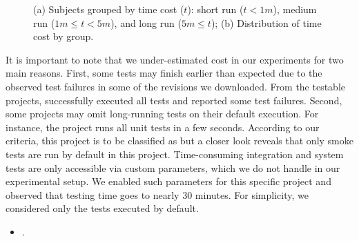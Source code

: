 \begin{figure}[ht]
\begin{subfigure}{0.25\textwidth}
        \caption{\label{fig:rq1-boxplot}}
    \end{subfigure}%
    \caption{(a) Subjects grouped by time cost ($t$): short run ($t <
    1m$), medium run ($1m \le t < 5m$), and long run ($5m \le t$); (b)
    Distribution of time cost by group.}
\end{figure}


It is important to note that we under-estimated cost in our
experiments for two main reasons.  First, some tests may finish
earlier than expected due to the observed test failures in some of the
revisions we downloaded.  From the \numSubjs{} testable projects,
\numSubjsPass{} successfully executed all tests and \numSubjsFail{}
reported some test failures.  Second, some projects may omit
long-running tests on their default execution. For instance, the
project  runs all unit tests in a few
seconds.  According to our criteria, this project is to be classified
as \shortg{} but a closer look reveals that only smoke tests are run
by default in this project.  Time-consuming integration and system
tests are only accessible via custom parameters, which we do not
handle in our experimental setup.  We enabled such parameters for this
specific project and observed that testing time goes to nearly 30
minutes.  For simplicity, we considered only the tests executed by
default.

\vspace{1ex}
\begin{center}
\end{center}
\vspace{1ex}


\begin{itemize}
    \item \numRQB. \textbf{\RQB}
\end{itemize}

